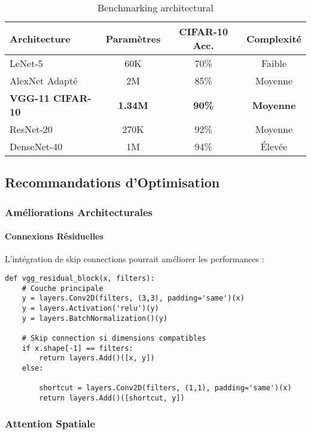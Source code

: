 \documentclass[12pt,a4paper]{article}
\begin{document}
\begin{table}[H]
\centering
\caption{Benchmarking architectural}
\begin{tabular}{lccc}
\toprule
\textbf{Architecture} & \textbf{Paramètres} & \textbf{CIFAR-10 Acc.} & \textbf{Complexité} \\
\midrule
LeNet-5 & 60K &  70\% & Faible \\
AlexNet Adapté & 2M & 85\% & Moyenne \\
\textbf{VGG-11 CIFAR-10} & \textbf{1.34M} & \textbf{90\%} & \textbf{Moyenne} \\
ResNet-20 & 270K &  92\% & Moyenne \\
DenseNet-40 & 1M &  94\% & Élevée \\
\bottomrule
\end{tabular}
\end{table}

\subsection{Recommandations d'Optimisation}

\subsubsection{Améliorations Architecturales}

\paragraph{Connexions Résiduelles}

L'intégration de skip connections pourrait améliorer les performances :

\begin{lstlisting}[style=pythonstyle, caption=Bloc VGG avec connexions résiduelles]
def vgg_residual_block(x, filters):
    # Couche principale
    y = layers.Conv2D(filters, (3,3), padding='same')(x)
    y = layers.Activation('relu')(y)
    y = layers.BatchNormalization()(y)
    
    # Skip connection si dimensions compatibles
    if x.shape[-1] == filters:
        return layers.Add()([x, y])
    else:
        
        shortcut = layers.Conv2D(filters, (1,1), padding='same')(x)
        return layers.Add()([shortcut, y])
\end{lstlisting}

\subsubsection{Attention Spatiale}
\end{document}
